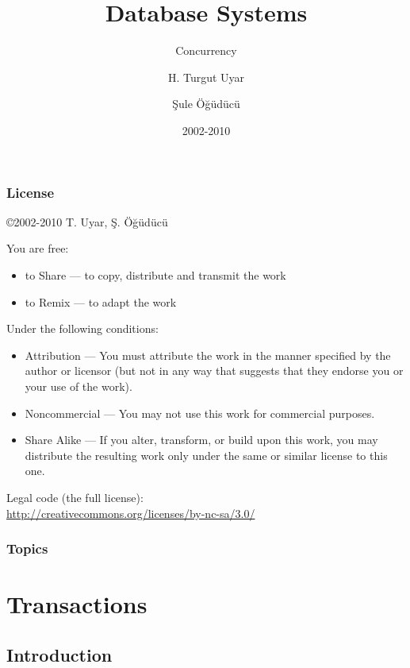 \documentclass[dvipsnames]{beamer}
\title{Database Systems}
\subtitle{Concurrency}
\author{H. Turgut Uyar \and Şule Öğüdücü}
\date{2002-2010}
\theoremstyle{plain}
\begin{document}
\begin{frame}
  \titlepage
\end{frame}

\begin{frame}
  \frametitle{License}

  \hfill
  \copyright 2002-2010 T. Uyar, Ş. Öğüdücü

  \vfill
  \begin{tiny}
    You are free:
    \begin{itemize}
      \item to Share — to copy, distribute and transmit the work
      \item to Remix — to adapt the work
    \end{itemize}

    Under the following conditions:
    \begin{itemize}
      \item Attribution — You must attribute the work in the manner specified by
        the author or licensor (but not in any way that suggests that they
        endorse you or your use of the work).

      \item Noncommercial — You may not use this work for commercial purposes.

      \item Share Alike — If you alter, transform, or build upon this work, you
        may distribute the resulting work only under the same or similar license
        to this one.
    \end{itemize}
  \end{tiny}

  \vfill
  Legal code (the full license):\\
  \url{http://creativecommons.org/licenses/by-nc-sa/3.0/}
\end{frame}

\begin{frame}
  \frametitle{Topics}
  \tableofcontents
\end{frame}

\section{Transactions}

\subsection{Introduction}
\end{document}

